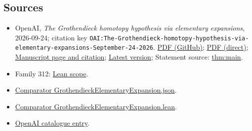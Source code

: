 \documentclass[11pt]{article}
\begin{document}
\subsection{Sources}
\begin{itemize}
\item OpenAI, \emph{The Grothendieck homotopy hypothesis via elementary expansions}, 2026-09-24; citation key \texttt{OAI:The-Grothendieck-homotopy-hypothesis-via-elementary-expansions-September-24-2026}. \href{https://github.com/openai/math/blob/adc7f1241b42e322a6451854ab7e4b4c146bf78a/preprints/The-Grothendieck-homotopy-hypothesis-via-elementary-expansions-September-24-2026/paper.pdf}{PDF (GitHub)}; \href{https://github.com/openai/math/raw/adc7f1241b42e322a6451854ab7e4b4c146bf78a/preprints/The-Grothendieck-homotopy-hypothesis-via-elementary-expansions-September-24-2026/paper.pdf}{PDF (direct)}; \href{https://github.com/openai/math/blob/adc7f1241b42e322a6451854ab7e4b4c146bf78a/preprints/The-Grothendieck-homotopy-hypothesis-via-elementary-expansions-September-24-2026/README.md}{Manuscript page and citation}; \href{https://github.com/openai/math/blob/main/preprints/The-Grothendieck-homotopy-hypothesis-via-elementary-expansions-September-24-2026/paper.pdf}{Latest version}; Statement source: \href{https://github.com/openai/math/blob/adc7f1241b42e322a6451854ab7e4b4c146bf78a/preprints/The-Grothendieck-homotopy-hypothesis-via-elementary-expansions-September-24-2026/build/sections/00-introduction.tex\#L50}{thm:main}.
\item Family 312: \href{https://github.com/openai/math/blob/adc7f1241b42e322a6451854ab7e4b4c146bf78a/lean/docs/312.md}{Lean scope}.
\item \href{https://github.com/openai/math/blob/adc7f1241b42e322a6451854ab7e4b4c146bf78a/lean/ComparatorChallenges/GrothendieckElementaryExpansion.json}{Comparator GrothendieckElementaryExpansion.json}.
\item \href{https://github.com/openai/math/blob/adc7f1241b42e322a6451854ab7e4b4c146bf78a/lean/ComparatorChallenges/GrothendieckElementaryExpansion.lean}{Comparator GrothendieckElementaryExpansion.lean}.
\item \href{https://github.com/openai/math/blob/adc7f1241b42e322a6451854ab7e4b4c146bf78a/CONTENTS.md}{OpenAI catalogue entry}.
\end{itemize}
\end{document}
